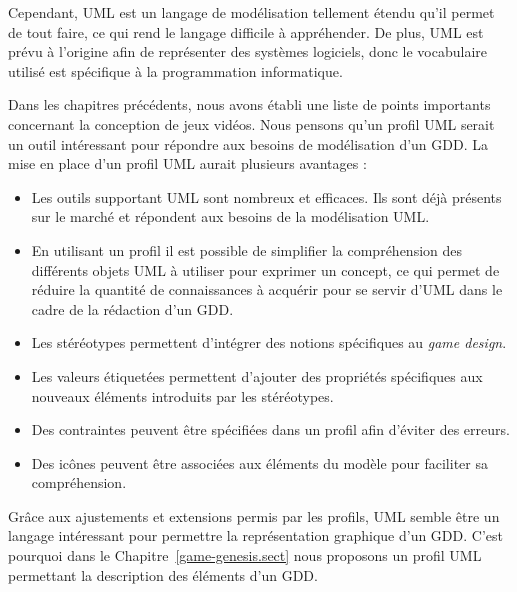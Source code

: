 


Cependant, UML est un langage de modélisation tellement étendu qu'il permet de tout faire, ce qui rend le langage difficile à appréhender.
De plus, UML est prévu à l'origine afin de représenter des systèmes logiciels, donc le vocabulaire utilisé est spécifique à la programmation informatique.


Dans les chapitres précédents, nous avons établi une liste de points importants concernant la conception de jeux vidéos.
Nous pensons qu'un profil UML serait un outil int\'eressant pour répondre aux besoins de modélisation d'un GDD.
La mise en place d'un profil UML aurait plusieurs avantages :
\begin{itemize}
    \item Les outils supportant UML sont nombreux et efficaces. Ils sont déjà présents sur le marché et répondent aux besoins de la modélisation UML.

    \item En utilisant un profil il est possible de simplifier la compréhension des différents objets UML à utiliser pour exprimer un concept, ce qui permet de réduire la quantité de connaissances à acquérir pour se servir d'UML dans le cadre de la rédaction d'un GDD.

    \item Les stéréotypes permettent d'intégrer des notions spécifiques au \emph{game design}.

    \item Les valeurs \'etiquet\'ees permettent d'ajouter des propriétés spécifiques aux nouveaux éléments introduits par les st\'er\'eotypes.

    \item Des contraintes peuvent être sp\'ecifi\'ees dans un profil afin d'éviter des erreurs.

    \item Des ic\^ones peuvent être associ\'ees aux éléments du modèle pour faciliter sa compréhension.
\end{itemize}



Grâce aux ajustements et extensions permis par les profils, UML semble être un langage int\'eressant pour permettre la représentation graphique d'un GDD.
C'est pourquoi dans le Chapitre~\ref{game-genesis.sect} nous proposons un profil UML permettant la description des éléments d'un GDD.
